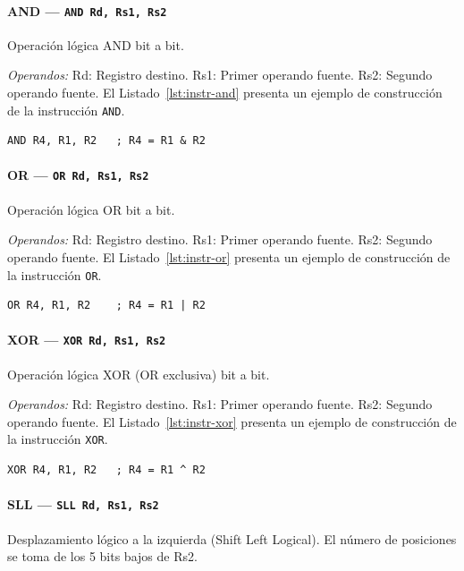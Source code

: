\documentclass[../main.tex]{subfiles}
\begin{document}
\paragraph*{AND --- \texttt{AND Rd, Rs1, Rs2}}
Operación lógica AND bit a bit.

\textit{Operandos:} Rd: Registro destino. Rs1: Primer operando fuente. Rs2: Segundo operando fuente.
El Listado~\ref{lst:instr-and} presenta un ejemplo de construcción de la instrucción \texttt{AND}.

\begin{lstlisting}[caption={AND},label={lst:instr-and}]
	AND R4, R1, R2   ; R4 = R1 & R2
\end{lstlisting}

\paragraph*{OR --- \texttt{OR Rd, Rs1, Rs2}}
Operación lógica OR bit a bit.

\textit{Operandos:} Rd: Registro destino. Rs1: Primer operando fuente. Rs2: Segundo operando fuente.
El Listado~\ref{lst:instr-or} presenta un ejemplo de construcción de la instrucción \texttt{OR}.

\begin{lstlisting}[caption={OR},label={lst:instr-or}]
	OR R4, R1, R2    ; R4 = R1 | R2
\end{lstlisting}

\paragraph*{XOR --- \texttt{XOR Rd, Rs1, Rs2}}
Operación lógica XOR (OR exclusiva) bit a bit.

\textit{Operandos:} Rd: Registro destino. Rs1: Primer operando fuente. Rs2: Segundo operando fuente.
El Listado~\ref{lst:instr-xor} presenta un ejemplo de construcción de la instrucción \texttt{XOR}.

\begin{lstlisting}[caption={XOR},label={lst:instr-xor}]
	XOR R4, R1, R2   ; R4 = R1 ^ R2
\end{lstlisting}

\paragraph*{SLL --- \texttt{SLL Rd, Rs1, Rs2}}
Desplazamiento lógico a la izquierda (Shift Left Logical). El número de posiciones se toma de los 5 bits bajos de Rs2.
\end{document}
